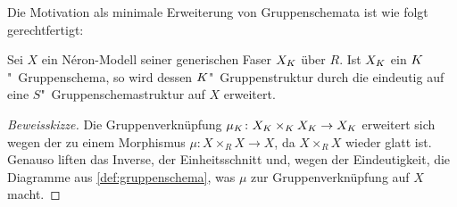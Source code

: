 Die Motivation als minimale Erweiterung von Gruppenschemata ist wie
folgt gerechtfertigt:
\begin{Lemma}\label{thm:gruppenschemaerweiterung}
  Sei $X$ ein Néron-Modell seiner generischen Faser $X_{K}$ über $R$. Ist
  $X_{K}$ ein $K$"~Gruppenschema, so wird dessen $K$"~Gruppenstruktur
  durch die \NAbbEig eindeutig auf eine $S$"~Gruppenschemastruktur auf
  $X$ erweitert.
  \begin{proof}[Beweisskizze]
    Die Gruppenverknüpfung $\mu_{K}\colon X_{K}\times_{K} X_{K}\to X_{K}$
    erweitert sich wegen der \NAbbEig zu einem Morphismus
    $\mu\colon X\times_R X\to X$, da $X\times_R X$ wieder glatt ist.
    Genauso liften das Inverse, der Einheitsschnitt und, wegen der
    Eindeutigkeit, die Diagramme aus \ref{def:gruppenschema}, was
    $\mu$ zur Gruppenverknüpfung auf $X$ macht.
  \end{proof}
\end{Lemma}


